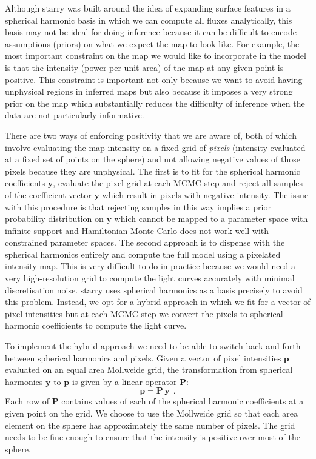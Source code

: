 \documentclass[12pt,dvipsnames]{report}
\newcommand{\hquad}{~~}
\begin{document}
Although \textsf{starry} was built around the idea of expanding surface features in a spherical harmonic basis in which we can compute all fluxes analytically, this basis may not be ideal for doing inference because it can be difficult to encode assumptions (priors) on what we expect the map to look like.
For example, the most important constraint on the map we would like to incorporate in the model is that the intensity (power per unit area) of the map at any given point is positive. 
This constraint is important not only because we want to avoid having unphysical regions in inferred maps but also because it imposes a very strong prior on the map which substantially reduces the difficulty of inference when the data are not particularly informative.

There are two ways of enforcing positivity that we are aware of, both of which involve evaluating the map intensity on a fixed grid of \emph{pixels} (intensity evaluated at a fixed set of points on the sphere) and not allowing negative values of those pixels because they are unphysical.
The first is to fit for the spherical harmonic coefficients $\mathbf{y}$, evaluate the pixel grid at each MCMC step and reject all samples of the coefficient vector $\mathbf{y}$ which result in pixels with negative intensity.
The issue with this procedure is that rejecting samples in this way implies a prior probability distribution on $\mathbf{y}$ which cannot be mapped to a parameter space with infinite support and Hamiltonian Monte Carlo does not work well with constrained parameter spaces.
The second approach is to dispense with the spherical harmonics entirely and compute the full model using a pixelated intensity map.
This is very difficult to do in practice because we would need a very high-resolution grid to compute the light curves accurately with minimal discretisation noise.  
\textsf{starry} uses spherical harmonics as a basis precisely to avoid this problem.
Instead, we opt for a hybrid approach in which we fit for a vector of pixel intensities but at each MCMC step we convert the pixels to spherical harmonic coefficients to compute the light curve.

To implement the hybrid approach we need to be able to switch back and forth between spherical harmonics and pixels.
Given a vector of pixel intensities $\mathbf{p}$ evaluated on an equal area Mollweide grid, the transformation from spherical harmonics $\mathbf{y}$ to $\mathbf{p}$ is given by a linear operator $\mathbf{P}$:
\begin{equation}
    \mathbf{p}=\mathbf{P}\,\mathbf{y}
    \hquad.
    \label{eq:ylms_to_pixels}
\end{equation}
Each row of $\mathbf{P}$ contains values of each of the spherical harmonic coefficients at a given point on the grid. 
We choose to use the Mollweide grid so that each area element on the sphere has approximately the same number of pixels.
The grid needs to be fine enough to ensure that the intensity is positive over most of the sphere.
\end{document}
